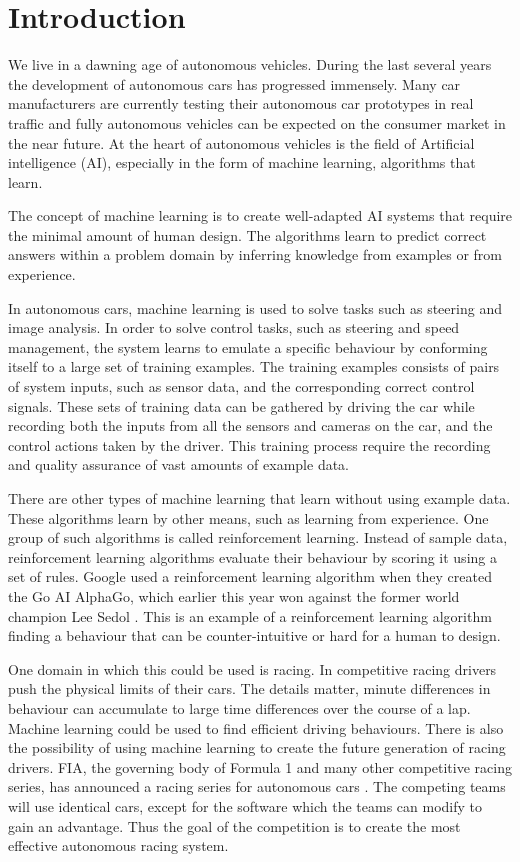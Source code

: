 \chapter{Introduction}
\label{introduction}

We live in a dawning age of autonomous vehicles. During the last several years the development of autonomous cars has progressed immensely. Many car manufacturers are currently testing their autonomous car prototypes in real traffic and fully autonomous vehicles can be expected on the consumer market in the near future. At the heart of autonomous vehicles is the field of Artificial intelligence (AI), especially in the form of machine learning, algorithms that learn.

The concept of machine learning is to create well-adapted AI systems that require the minimal amount of human design. The algorithms learn to predict correct answers within a problem domain by inferring knowledge from examples or from experience. 

In autonomous cars, machine learning is used to solve tasks such as steering and image analysis. In order to solve control tasks, such as steering and speed management, the system learns to emulate a specific behaviour by conforming itself to a large set of training examples. The training examples consists of pairs of system inputs, such as sensor data, and the corresponding correct control signals. These sets of training data can be gathered by driving the car while recording both the inputs from all the sensors and cameras on the car, and the control actions taken by the driver. This training process require the recording and quality assurance of vast amounts of example data.

There are other types of machine learning that learn without using example data. These algorithms learn by other means, such as learning from experience. One group of such algorithms is called reinforcement learning. Instead of sample data, reinforcement learning algorithms evaluate their behaviour by scoring it using a set of rules. Google used a reinforcement learning algorithm when they created the Go AI AlphaGo\cite{gibney}, which earlier this year won against the former world champion Lee Sedol \cite{AlphaGo}. This is an example of a reinforcement learning algorithm finding a behaviour that can be counter-intuitive or hard for a human to design.

One domain in which this could be used is racing. In competitive racing drivers push the physical limits of their cars. The details matter, minute differences in behaviour can accumulate to large time differences over the course of a lap. Machine learning could be used to find efficient driving behaviours. There is also the possibility of using machine learning to create the future generation of racing drivers. FIA, the governing body of Formula 1 and many other competitive racing series, has announced a racing series for autonomous cars \cite{roborace}. The competing teams will use identical cars, except for the software which the teams can modify to gain an advantage. Thus the goal of the competition is to create the most effective autonomous racing system. 

